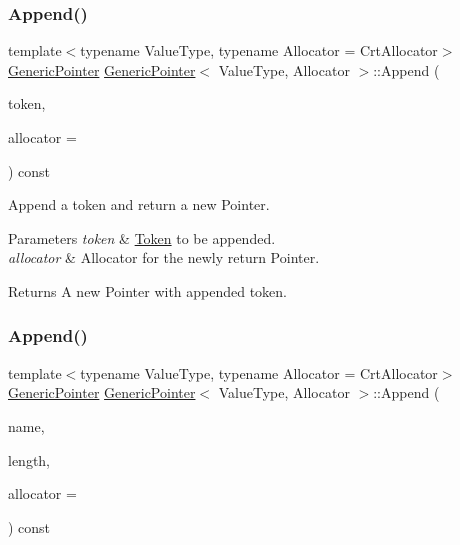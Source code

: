\subsubsection{\texorpdfstring{Append()}{Append()}\hspace{0.1cm}{\footnotesize\ttfamily [1/2]}}
{\footnotesize\ttfamily template$<$typename Value\+Type, typename Allocator = Crt\+Allocator$>$ \\
\hyperlink{a02232}{Generic\+Pointer} \hyperlink{a02232}{Generic\+Pointer}$<$ Value\+Type, Allocator $>$\+::Append (\begin{DoxyParamCaption}\item[{const \hyperlink{a02308}{Token} \&}]{token,  }\item[{Allocator $\ast$}]{allocator = {} }\end{DoxyParamCaption}) const\hspace{0.3cm}{\ttfamily [inline]}}



Append a token and return a new Pointer. 


\begin{DoxyParams}{Parameters}
{\em token} & \hyperlink{a02308}{Token} to be appended. \\
\hline
{\em allocator} & Allocator for the newly return Pointer. \\
\hline
\end{DoxyParams}
\begin{DoxyReturn}{Returns}
A new Pointer with appended token. 
\end{DoxyReturn}
\mbox{\label{a02232_a9f8a1711f5b8e0d951c25c6c65326f77}} 
\subsubsection{\texorpdfstring{Append()}{Append()}\hspace{0.1cm}{\footnotesize\ttfamily [2/2]}}
{\footnotesize\ttfamily template$<$typename Value\+Type, typename Allocator = Crt\+Allocator$>$ \\
\hyperlink{a02232}{Generic\+Pointer} \hyperlink{a02232}{Generic\+Pointer}$<$ Value\+Type, Allocator $>$\+::Append (\begin{DoxyParamCaption}\item[{const \hyperlink{a02232_ab292356c11b4015c98d21b966b11f285}{Ch} $\ast$}]{name,  }\item[{\hyperlink{a00560_a5ed6e6e67250fadbd041127e6386dcb5}{Size\+Type}}]{length,  }\item[{Allocator $\ast$}]{allocator = {} }\end{DoxyParamCaption}) const\hspace{0.3cm}{\ttfamily [inline]}}



